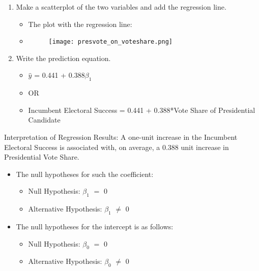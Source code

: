 \documentclass[12pt,letterpaper]{article}
\begin{document}
\begin{enumerate}
\begin{itemize}
\begin{table}[!htbp]
	\end{table} 

\end{itemize}
	\vspace{5cm}
\newpage
		\item Make a scatterplot of the two variables and add the regression line. 


\begin{itemize}
	\item The plot with the regression line:
	\item 
	\begin{figure}[h]
		\centering
		\texttt{[image: presvote\_on\_voteshare.png]}
	\end{figure}
\end{itemize}
		\item Write the prediction equation.
		
\begin{itemize}
	\item $\hat{y}$ = 0.441 + 0.388$\beta_1$
	\item OR
	\item Incumbent Electoral Success = 0.441 + 0.388*Vote Share of Presidential Candidate
\end{itemize}
	\end{enumerate}


\begin{flushleft}Interpretation of Regression Results: A one-unit increase in the Incumbent Electoral Success is associated with, on average, a 0.388 unit increase in Presidential Vote Share.
	\end{flushleft}

\begin{itemize}
	\item  The null hypotheses for such the coefficient:
	\begin{itemize}
		\item {Null Hypothesis: $\beta_1$ $=$ 0}
		\item {Alternative Hypothesis: $\beta_1$ $\neq$ 0}
	\end{itemize}
	
	\item The null hypotheses for the intercept is as follows:
	\begin{itemize}
		\item {Null Hypothesis: $\beta_0$ $=$ 0}
		\item {Alternative Hypothesis: $\beta_0$ $\neq$ 0}
	\end{itemize}
	
\end{itemize}
\end{document}
